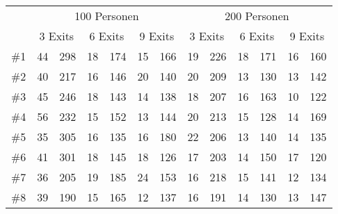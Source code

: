\begin{table}[h]
\begin{tabular}{c|c|c|c|c|c|c|c|c|c|c|c|c|}
\cline{2-13}
                           & \multicolumn{6}{|c}{100 Personen}                                                          & \multicolumn{6}{|c|}{200 Personen}                                                          \\ \cline{2-13} 
                           & \multicolumn{2}{|c}{3 Exits} & \multicolumn{2}{|c}{6 Exits} & \multicolumn{2}{|c}{9 Exits} & \multicolumn{2}{|c}{3 Exits} & \multicolumn{2}{|c}{6 Exits} & \multicolumn{2}{|c|}{9 Exits} \\ \hline
\multicolumn{1}{|c|}{\#1}  & 44           & 298           & 18           & 174           & 15           & 166           & 19           & 226           & 18           & 171           & 16            & 160           \\ \hline
\multicolumn{1}{|c|}{\#2}  & 40           & 217           & 16           & 146           & 20           & 140           & 20           & 209           & 13           & 130           & 13            & 142           \\ \hline
\multicolumn{1}{|c|}{\#3}  & 45           & 246           & 18           & 143           & 14           & 138           & 18           & 207           & 16           & 163           & 10            & 122           \\ \hline
\multicolumn{1}{|c|}{\#4}  & 56           & 232           & 15           & 152           & 13           & 144           & 20           & 213           & 15           & 128           & 14            & 169           \\ \hline
\multicolumn{1}{|c|}{\#5}  & 35           & 305           & 16           & 135           & 16           & 180           & 22           & 206           & 13           & 140           & 14            & 135           \\ \hline
\multicolumn{1}{|c|}{\#6}  & 41           & 301           & 18           & 145           & 18           & 126           & 17           & 203           & 14           & 150           & 17            & 120           \\ \hline
\multicolumn{1}{|c|}{\#7}  & 36           & 205           & 19           & 185           & 24           & 153           & 16           & 218           & 15           & 141           & 12            & 134           \\ \hline
\multicolumn{1}{|c|}{\#8}  & 39           & 190           & 15           & 165           & 12           & 137           & 16           & 191           & 14           & 130           & 13            & 147           \\ \hline

\end{tabular}
\end{table}
